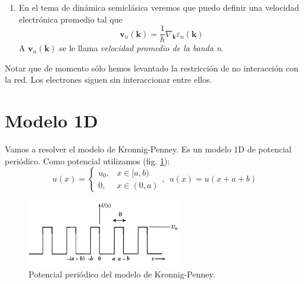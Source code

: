 \begin{enumerate}
\begin{equation}
  \exists n \ | \
  \begin{cases}
    \varepsilon_{n,\mathbf{k}} &=
    \varepsilon_{n,\mathbf{k}+\mathbf{G}} \\
    \psi_{n,\mathbf{k}} &= \psi_{n,\mathbf{k}+\mathbf{G}}
  \end{cases}
\end{equation}
A este conjunto de soluciones $\{\varepsilon_{n,\mathbf{k}} =
\varepsilon_n (\mathbf{k})\}$ se le denota \emph{estructura de bandas
  del sólido}. Al fijar la $n$, a los $\varepsilon_n (\mathbf{k})$ se
les denota \emph{bandas de energía}.
Como son funciones periódicas y contínuas\footnote{Notar que las
  $\mathbf{k}$ son contínuas porque el teorema de Bloch no les impone
  ninguna restricción. Posteriores imposiciones, como condiciones
  periódicas, pueden discretizar las $\mathbf{k}$.} en $\mathbf{k}$, han de
tener una cota superior e inferior (de manera análoga al $\sin x$).
\item En el tema de dinámica semiclásica veremos que puedo definir una
  velocidad electrónica promedio tal que
\begin{equation}
  \mathbf{v}_n(\mathbf{k}) = \frac{1}{\hbar} \nabla _\mathbf{k}
  \varepsilon_n (\mathbf{k})
\end{equation}
A $\mathbf{v}_n(\mathbf{k})$ se le llama \emph{velocidad promedio de la banda \emph{n}}.
\end{enumerate}

Notar que de momento sólo hemos levantado la restricción de no
interacción con la red. Los electrones siguen sin interaccionar entre ellos.

\section{Modelo 1D}
Vamos a resolver el modelo de Kronnig-Penney. Es un modelo 1D de
potencial periódico. Como potencial utilizamos (fig. \ref{fig:kronnigpot}):
\begin{equation}
  u(x) =
  \begin{cases}
    u_0, &x\in [a,b) \\
    0, & x\in (0,a)
  \end{cases}, \ \ u(x) = u(x+a+b)
\end{equation}


\begin{figure}
  \centering
    \includegraphics[width=0.6\textwidth]{figures/kronnigpot.png}
  \caption{Potencial periódico del modelo de Kronnig-Penney.}
  \label{fig:kronnigpot}
\end{figure}

